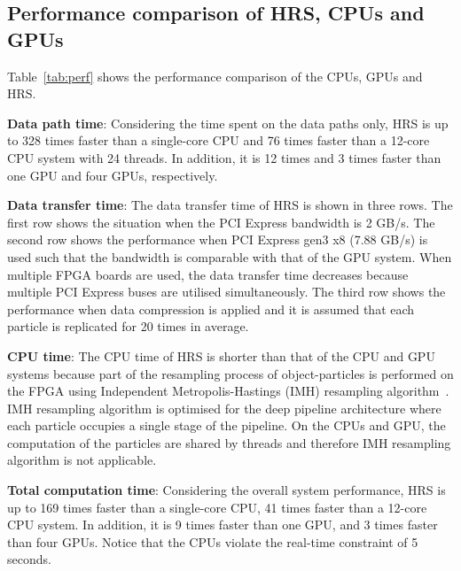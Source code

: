 \subsection{Performance comparison of HRS, CPUs and GPUs}
Table~\ref{tab:perf} shows the performance comparison of the CPUs, GPUs and HRS.

\textbf{Data path time}: Considering the time spent on the data paths only, HRS is up to 328 times faster than a single-core CPU and 76 times faster than a 12-core CPU system with 24 threads.
In addition, it is 12 times and 3 times faster than one GPU and four GPUs, respectively.

\textbf{Data transfer time}: The data transfer time of HRS is shown in three rows.
The first row shows the situation when the PCI Express bandwidth is 2 GB/s.
The second row shows the performance when PCI Express gen3 x8 (7.88 GB/s) is used such that the bandwidth is comparable with that of the GPU system.
When multiple FPGA boards are used, the data transfer time decreases because multiple PCI Express buses are utilised simultaneously.
The third row shows the performance when data compression is applied and it is assumed that each particle is replicated for 20 times in average.

\textbf{CPU time}: The CPU time of HRS is shorter than that of the CPU and GPU systems because part of the resampling process of object-particles is performed on the FPGA using Independent Metropolis-Hastings (IMH) resampling algorithm~\cite{miao11}.
IMH resampling algorithm is optimised for the deep pipeline architecture where each particle occupies a single stage of the pipeline.
On the CPUs and GPU, the computation of the particles are shared by threads and therefore IMH resampling algorithm is not applicable.

\textbf{Total computation time}: Considering the overall system performance, HRS is up to 169 times faster than a single-core CPU, 41 times faster than a 12-core CPU system.
In addition, it is 9 times faster than one GPU, and 3 times faster than four GPUs.
Notice that the CPUs violate the real-time constraint of 5 seconds.

